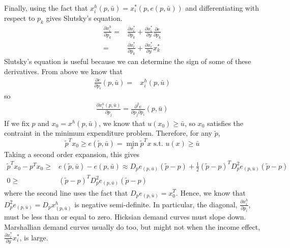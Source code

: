 \begin{example}
  Finally, using the fact that $x_i^h(p,\bar{u}) =
  x_i^*(p,e(p,\bar{u}))$ and differentiating with respect to $p_k$
  gives Slutsky's equation.
  \begin{align*}
    \frac{\partial x_i^h}{\partial p_k} = & \frac{\partial
                                            x_i^*}{\partial p_k} + \frac{\partial x_i^*}{\partial y}
                                            \frac{\partial e}{\partial p_k} \\
    = & \frac{\partial
        x_i^*}{\partial p_k} + \frac{\partial x_i^*}{\partial y}
        x_k^*
  \end{align*}
  Slutsky's equation is useful because we can determine the sign of
  some of these derivatives. From above we know that
  \begin{align*}
    \frac{\partial e}{\partial p_i}(p,\bar{u}) = & x_i^h(p,\bar{u})
  \end{align*}
  so 
  \begin{align*}
    \frac{\partial x_i^h(p,\bar{u})}{\partial p_j} = \frac{\partial^2
    e}{\partial p_j \partial p_i}(p,\bar{u}) 
  \end{align*}
  If we fix $p$ and $x_0 = x^h(p, \bar{u})$, we know that $u(x_0)
  \geq \bar{u}$, so $x_0$ satisfies the contraint in the minimum
  expenditure problem. Therefore, for any $\tilde{p}$, 
  \[ \tilde{p}^T x_0 \geq e(\tilde{p},\bar{u}) = \min_x \tilde{p}^T x \text{ s.t. } u(x) \geq
    \bar{u} \]
  Taking a second order expansion,  this gives
  \begin{align*}
    \tilde{p}^T x_0 - p^T x_0 \geq & e(\tilde{p},\bar{u})  -
    e(p,\bar{u}) \approx D_p e_{(p,\bar{u})} (\tilde{p} - p)  +
                                     \frac{1}{2} (\tilde{p} - p)^T
                                     D^2_p e_{(p,\bar{u})} (\tilde{p} - p) \\
    0 \geq & (\tilde{p} - p)^T D^2_p e_{(p,\bar{u})} (\tilde{p} - p) 
  \end{align*}
  where the second line uses the fact that $D_p e_{(p,\bar{u})} =
  x_0^T$. Hence, we know that 
  $D^2_p e_{(p,\bar{u})} = D_p x^h_{(p,\bar{u})}$ is negative
  semi-definite. In particular, the 
  diagonal, $\frac{\partial x_i^h}{\partial p_i}$, must be less than
  or equal to zero.  Hicksian demand curves must slope
  down. Marshallian demand curves usually do too, but might not when the
  income effect, $\frac{\partial x_i^*}{\partial y} x_i^*$, is large.  
\end{example}

